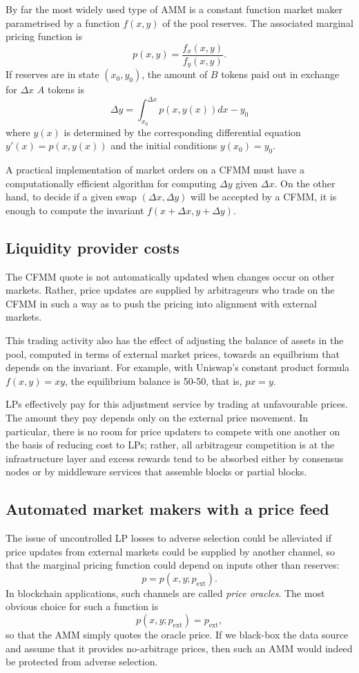 \documentclass[a4paper,10pt]{article}
\begin{document}
By far the most widely used type of AMM is a constant function market maker parametrised by a function $f(x,y)$ of the pool reserves.
%
The associated marginal pricing function is 
\[
  p(x,y) = \frac{f_x(x,y)}{f_y(x,y)}.
\]
If reserves are in state $(x_0,y_0)$, the amount of $B$ tokens paid out in exchange for $\Delta x$ $A$ tokens is
\[
  \Delta y = \int_{x_0}^{\Delta x} p(x,y(x))dx - y_0
\]
where $y(x)$ is determined by the corresponding differential equation $y'(x) = p(x,y(x))$ and the initial conditions $y(x_0)=y_0$.

A practical implementation of market orders on a CFMM must have a computationally efficient algorithm for computing $\Delta y$ given $\Delta x$.
%
On the other hand, to decide if a given swap $(\Delta x, \Delta y)$ will be accepted by a CFMM, it is enough to compute the invariant $f(x+\Delta x,y+\Delta y)$.

\subsection{Liquidity provider costs}

The CFMM quote is not automatically updated when changes occur on other markets. 
%
Rather, price updates are supplied by arbitrageurs who trade on the CFMM in such a way as to push the pricing into alignment with external markets. 

This trading activity also has the effect of adjusting the balance of assets in the pool, computed in terms of external market prices, towards an equilbrium that depends on the invariant. For example, with Uniswap's constant product formula $f(x,y)=xy$, the equilibrium balance is 50-50, that is, $px=y$.

LPs effectively pay for this adjustment service by trading at unfavourable prices. 
%
The amount they pay depends only on the external price movement.
%
In particular, there is no room for price updaters to compete with one another on the basis of reducing cost to LPs; rather, all arbitrageur competition is at the infrastructure layer and excess rewards tend to be absorbed either by consensus nodes or by middleware services that assemble blocks or partial blocks.

\subsection{Automated market makers with a price feed}

The issue of uncontrolled LP losses to adverse selection could be alleviated if price updates from external markets could be supplied by another channel, so that the marginal pricing function could depend on inputs other than reserves:
\[
  p = p(x,y;p_\mathrm{ext}).
\]
%
In blockchain applications, such channels are called \emph{price oracles}. 
%
The most obvious choice for such a function is
\[
  p(x,y;p_\mathrm{ext}) = p_\mathrm{ext},
\]
so that the AMM simply quotes the oracle price.
%
If we black-box the data source and assume that it provides no-arbitrage prices, then such an AMM would indeed be protected from adverse selection.
\end{document}
